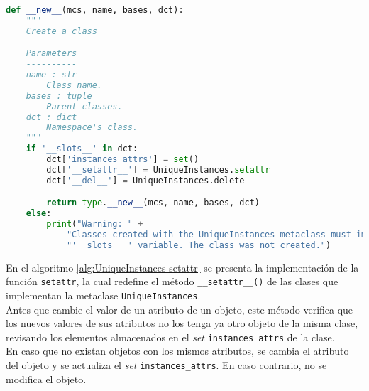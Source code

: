 \begin{lstlisting}[language=Python,caption=Método \texttt{\_\_new\_\_()} de la metaclase \texttt{UniqueInstances}.,label=alg:UniqueInstances-new, frame=single]
def __new__(mcs, name, bases, dct):
    """
    Create a class

    Parameters
    ----------
    name : str
        Class name.
    bases : tuple
        Parent classes.
    dct : dict
        Namespace's class.
    """
    if '__slots__' in dct:
        dct['instances_attrs'] = set()
        dct['__setattr__'] = UniqueInstances.setattr
        dct['__del__'] = UniqueInstances.delete

        return type.__new__(mcs, name, bases, dct)
    else:
        print("Warning: " +
            "Classes created with the UniqueInstances metaclass must implement the " +
            "'__slots__ ' variable. The class was not created.")
\end{lstlisting}
\bigskip

En el algoritmo \ref{alg:UniqueInstances-setattr} se presenta la implementación de la función \verb|setattr|, la cual redefine el método \verb|__setattr__()| de las clases que implementan la metaclase \verb|UniqueInstances|.\\

Antes que cambie el valor de un atributo de un objeto, este método verifica que los nuevos valores de sus atributos no los tenga ya otro objeto de la misma clase, revisando los elementos almacenados en el \emph{set} \verb|instances_attrs| de la clase.\\

En caso que no existan objetos con los mismos atributos, se cambia el atributo del objeto y se actualiza el \emph{set} \verb|instances_attrs|. En caso contrario, no se modifica el objeto.\\

